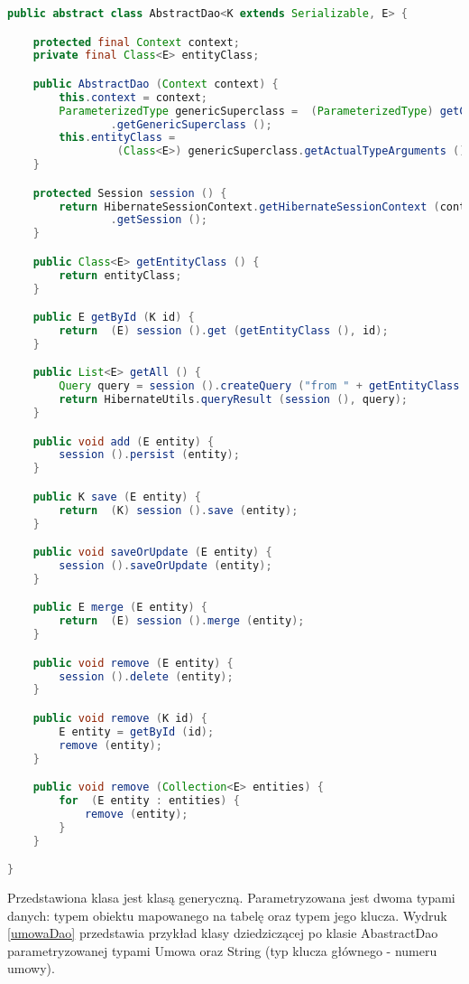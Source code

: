\begin{lstlisting}[language=Java,style=outcode,showstringspaces=false,caption=Abstrakcyjna klasa DAO,label={abstractDao}]
public abstract class AbstractDao<K extends Serializable, E> {

	protected final Context context;
	private final Class<E> entityClass;

	public AbstractDao (Context context) {
		this.context = context;
		ParameterizedType genericSuperclass =  (ParameterizedType) getClass ()
				.getGenericSuperclass ();
		this.entityClass = 
				 (Class<E>) genericSuperclass.getActualTypeArguments ()[1];
	}

	protected Session session () {
		return HibernateSessionContext.getHibernateSessionContext (context)
				.getSession ();
	}

	public Class<E> getEntityClass () {
		return entityClass;
	}

	public E getById (K id) {
		return  (E) session ().get (getEntityClass (), id);
	}

	public List<E> getAll () {
		Query query = session ().createQuery ("from " + getEntityClass ().getName ());
		return HibernateUtils.queryResult (session (), query);
	}

	public void add (E entity) {
		session ().persist (entity);
	}

	public K save (E entity) {
		return  (K) session ().save (entity);
	}

	public void saveOrUpdate (E entity) {
		session ().saveOrUpdate (entity);
	}

	public E merge (E entity) {
		return  (E) session ().merge (entity);
	}

	public void remove (E entity) {
		session ().delete (entity);
	}

	public void remove (K id) {
		E entity = getById (id);
		remove (entity);
	}

	public void remove (Collection<E> entities) {
		for  (E entity : entities) {
			remove (entity);
		}
	}

}
\end{lstlisting}

Przedstawiona klasa jest klasą generyczną. Parametryzowana jest dwoma typami danych: typem obiektu mapowanego na tabelę oraz typem jego klucza. Wydruk \ref{umowaDao} przedstawia przykład klasy dziedziczącej po klasie AbastractDao parametryzowanej typami Umowa oraz String (typ klucza głównego - numeru umowy).
